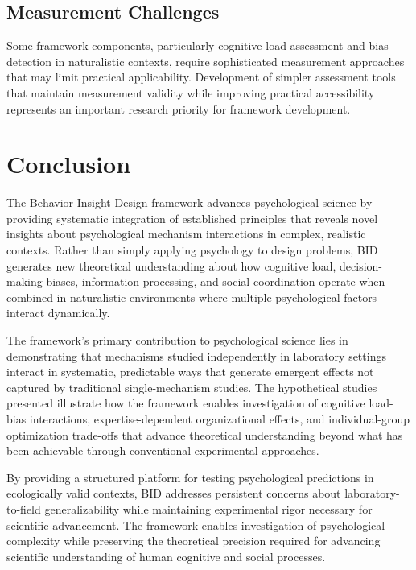 \documentclass[
  authoryear,
  preprint]{elsarticle}
\begin{document}
\subsection{Measurement Challenges}\label{measurement-challenges}

Some framework components, particularly cognitive load assessment and
bias detection in naturalistic contexts, require sophisticated
measurement approaches that may limit practical applicability.
Development of simpler assessment tools that maintain measurement
validity while improving practical accessibility represents an important
research priority for framework development.

\section{Conclusion}\label{conclusion}

The Behavior Insight Design framework advances psychological science by
providing systematic integration of established principles that reveals
novel insights about psychological mechanism interactions in complex,
realistic contexts. Rather than simply applying psychology to design
problems, BID generates new theoretical understanding about how
cognitive load, decision-making biases, information processing, and
social coordination operate when combined in naturalistic environments
where multiple psychological factors interact dynamically.

The framework's primary contribution to psychological science lies in
demonstrating that mechanisms studied independently in laboratory
settings interact in systematic, predictable ways that generate emergent
effects not captured by traditional single-mechanism studies. The
hypothetical studies presented illustrate how the framework enables
investigation of cognitive load-bias interactions, expertise-dependent
organizational effects, and individual-group optimization trade-offs
that advance theoretical understanding beyond what has been achievable
through conventional experimental approaches.

By providing a structured platform for testing psychological predictions
in ecologically valid contexts, BID addresses persistent concerns about
laboratory-to-field generalizability while maintaining experimental
rigor necessary for scientific advancement. The framework enables
investigation of psychological complexity while preserving the
theoretical precision required for advancing scientific understanding of
human cognitive and social processes.
\end{document}
